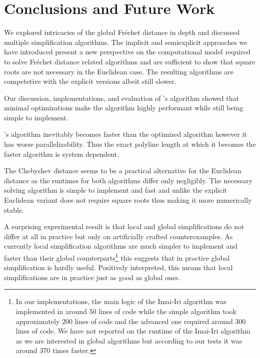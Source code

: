 \section{Conclusions and Future Work}
\label{sec:discussion_conclusion}

We explored intricacies of the global Fréchet distance in depth and discussed multiple simplification algorithms. 
The implicit and semiexplicit approaches we have introduced present a new perspective on the computational model required to solve Fréchet distance related algorithms and are sufficient to show that square roots are not necessary in the Euclidean case. The resulting algorithms are competetive with the explicit versions albeit still slower.

Our discussion, implementations, and evaluation of \citeauthor{on_optimal_polyline_simplification_using_the_hausdorff_and_frechet_distance}'s algorithm showed that minimal optimizations make the algorithm highly performant while still being simple to implement. 

\citeauthor{polyline_simplification_has_cubic_complexity_bringmannetal}'s algorithm inevitably becomes faster than the optimized \citeauthor{on_optimal_polyline_simplification_using_the_hausdorff_and_frechet_distance} algorithm however it has worse parallelizability. Thus the exact polyline length at which it becomes the faster algorithm is system dependent. 

The Chebyshev distance seems to be a practical alternative for the Euclidean distance as the runtimes for both algorithms differ only negligibly. The necessary solving algorithm is simple to implement and fast and unlike the explicit Euclidean variant does not require square roots thus making it more numerically stable. 

A surprising experimental result is that local and global simplifications do not differ at all in practice but only on artificially crafted counterexamples. As currently local simplification algorithms are much simpler to implement and faster than their global counterparts\footnote{In our implementations, the main logic of the Imai-Iri algorithm was implemented in around 50 lines of code while the simple algorithm took approximately 200 lines of code and the advanced one required around 300 lines of code. We have not reported on the runtime of the Imai-Iri algorithm as we are interested in global algorithms but according to our tests it was around 370 times faster.} this suggests that in practice global simplification is hardly useful. Positively interpreted, this means that local simplifications are in practice just as good as global ones. 

